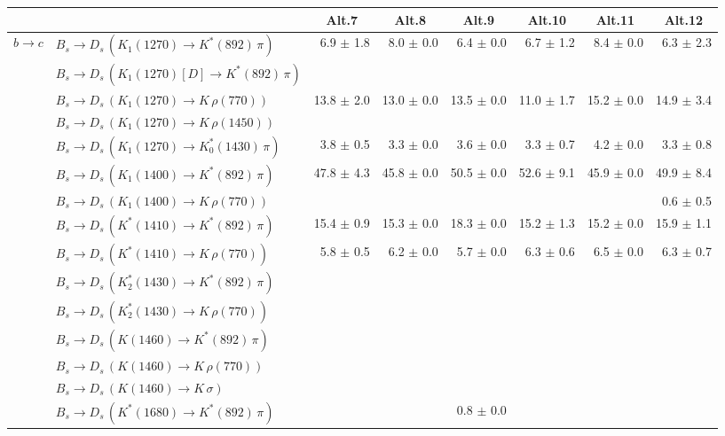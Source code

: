 \begin{tabular}{l l  r  r  r  r  r  r  } 
\hline
\hline
&  & \multicolumn{1}{c}{Alt.7}  & \multicolumn{1}{c}{Alt.8}  & \multicolumn{1}{c}{Alt.9}  & \multicolumn{1}{c}{Alt.10}  & \multicolumn{1}{c}{Alt.11}  & \multicolumn{1}{c}{Alt.12}  \\ 
\hline
\multirow{32}{*}{$b \to c$}  & $B_s \to D_s \, ( K_1(1270) \to K^{*}(892) \, \pi )$ & 6.9 $\pm$ 1.8 & 8.0 $\pm$ 0.0 & 6.4 $\pm$ 0.0 & 6.7 $\pm$ 1.2 & 8.4 $\pm$ 0.0 & 6.3 $\pm$ 2.3 \\ 
 & $B_s \to D_s \, ( K_1(1270)[D] \to K^{*}(892) \, \pi )$ &  &  &  &  &  &  \\ 
 & $B_s \to D_s \, ( K_1(1270) \to K \, \rho(770) )$ & 13.8 $\pm$ 2.0 & 13.0 $\pm$ 0.0 & 13.5 $\pm$ 0.0 & 11.0 $\pm$ 1.7 & 15.2 $\pm$ 0.0 & 14.9 $\pm$ 3.4 \\ 
 & $B_s \to D_s \, ( K_1(1270) \to K \, \rho(1450) )$ &  &  &  &  &  &  \\ 
 & $B_s \to D_s \, ( K_1(1270) \to K^{*}_{0}(1430) \, \pi )$ & 3.8 $\pm$ 0.5 & 3.3 $\pm$ 0.0 & 3.6 $\pm$ 0.0 & 3.3 $\pm$ 0.7 & 4.2 $\pm$ 0.0 & 3.3 $\pm$ 0.8 \\ 
 & $B_s \to D_s \, ( K_1(1400) \to K^{*}(892) \, \pi )$ & 47.8 $\pm$ 4.3 & 45.8 $\pm$ 0.0 & 50.5 $\pm$ 0.0 & 52.6 $\pm$ 9.1 & 45.9 $\pm$ 0.0 & 49.9 $\pm$ 8.4 \\ 
 & $B_s \to D_s \, ( K_1(1400) \to K \, \rho(770) )$ &  &  &  &  &  & 0.6 $\pm$ 0.5 \\ 
 & $B_s \to D_s \, ( K^{*}(1410) \to K^{*}(892) \, \pi )$ & 15.4 $\pm$ 0.9 & 15.3 $\pm$ 0.0 & 18.3 $\pm$ 0.0 & 15.2 $\pm$ 1.3 & 15.2 $\pm$ 0.0 & 15.9 $\pm$ 1.1 \\ 
 & $B_s \to D_s \, ( K^{*}(1410) \to K \, \rho(770) )$ & 5.8 $\pm$ 0.5 & 6.2 $\pm$ 0.0 & 5.7 $\pm$ 0.0 & 6.3 $\pm$ 0.6 & 6.5 $\pm$ 0.0 & 6.3 $\pm$ 0.7 \\ 
 & $B_s \to D_s \, ( K_2^{*}(1430) \to K^{*}(892) \, \pi )$ &  &  &  &  &  &  \\ 
 & $B_s \to D_s \, ( K_2^{*}(1430) \to K \, \rho(770) )$ &  &  &  &  &  &  \\ 
 & $B_s \to D_s \, ( K(1460) \to K^{*}(892) \, \pi )$ &  &  &  &  &  &  \\ 
 & $B_s \to D_s \, ( K(1460) \to K \, \rho(770) )$ &  &  &  &  &  &  \\ 
 & $B_s \to D_s \, ( K(1460) \to K \, \sigma )$ &  &  &  &  &  &  \\ 
 & $B_s \to D_s \, ( K^{*}(1680) \to K^{*}(892) \, \pi )$ &  &  & 0.8 $\pm$ 0.0 &  &  &  \\ 

\end{tabular}
